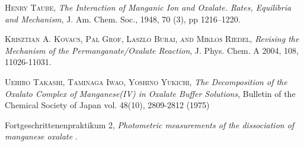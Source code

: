 \documentclass[a4paper,10pt]{article}
\begin{document}
 \begin{thebibliography}{99}

     \textsc{Henry Taube}, \textit{The Interaction of Manganic Ion and Oxalate. Rates, Equilibria and Mechanism}, J. Am. Chem. Soc., 1948, 70 (3), pp 1216–1220.

   \textsc{Krisztian A. Kovacs, Pal Grof, Laszlo Burai, and Miklos Riedel}, \textit{Revising the Mechanism of the Permanganate/Oxalate Reaction}, J. Phys. Chem. A 2004, 108, 11026-11031.

   \textsc{Uehiro Takashi, Taminaga Iwao, Yoshino Yukichi}, \textit{The Decomposition of the Oxalato Complex of Manganese(IV) in Oxalate Buffer Solutions}, Bulletin of the Chemical Society of Japan vol. 48(10), 2809-2812 (1975)

Fortgeschrittenenpraktikum 2, \textit{Photometric measurements of the dissociation of manganese oxalate
}. 

\end{thebibliography}
\end{document}
